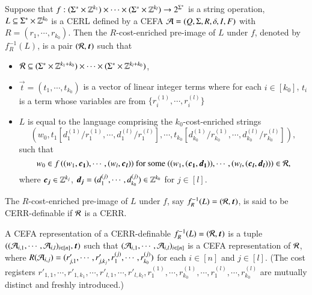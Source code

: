 \begin{definition}
Suppose that $f: (\Sigma^* \times \mathbb{Z}^{k_1}) \times \cdots \times (\Sigma^* \times \mathbb{Z}^{k_l}) \rightarrow 2^{\Sigma^*}$ is a string operation, $L \subseteq \Sigma^* \times \mathbb{Z}^{k_0}$ is a CERL defined by a CEFA $\mathcal{A}=(Q, \Sigma, R, \delta, I, F)$ with $R= (r_1, \cdots, r_{k_0})$. Then the $R$-cost-enriched pre-image of $L$ under $f$, denoted by $f^{-1}_R(L)$, is a pair $(\cR, \vec{t})$ such that 
\begin{itemize}
\item $\mathcal{R} \subseteq (\Sigma^* \times \mathbb{Z}^{k_1 + k_0}) \times \cdots \times (\Sigma^* \times \mathbb{Z}^{k_l + k_0})$,
\item $\vec{t} = (t_1, \cdots ,t_{k_0})$ is a vector of linear integer terms where for each $i \in [k_0]$, $t_i$ is a term whose variables are from $\{r^{(1)}_i, \cdots, r^{(l)}_i\}$ 

\item $L$ is equal to the language comprising the $k_0$-cost-enriched strings
%
\[\left(w_0, t_1\left[d^{(1)}_{1}/r^{(1)}_1, \cdots, d^{(l)}_{1}/r^{(l)}_1\right], \cdots, t_{k_0}\left[d^{(1)}_{k_0}/r^{(1)}_{k_0}, \cdots, d^{(l)}_{k_0}/r^{(l)}_{k_0}\right]
\right), \]
%
such that 
\[w_0 \in f\left((w_1, \vec{c_1}), \cdots, (w_l, \vec{c_l}\right)) \mbox{ for some } ((w_1, (\vec{c_1}, \vec{d_1})), \cdots, (w_l, (\vec{c_l}, \vec{d_l}))) \in \cR,\]
where $\vec{c_j} \in \Int^{k_j}$, $\vec{d_j} = (d^{(j)}_{1}, \cdots, d^{(j)}_{k_0}) \in \Int^{k_0}$ for $j\in [l]$.


%
\end{itemize}
The $R$-cost-enriched pre-image of $L$ under $f$, say $f^{-1}_R(L)=(\cR, \vec{t})$, is said to be CERR-definable if $\mathcal{R}$ is a CERR. 

A CEFA representation of a CERR-definable $f^{-1}_R(L)=(\cR, \vec{t})$ is a tuple $((\CEFA_{i,1}, \cdots, \CEFA_{i, l})_{i \in [n]}, \vec{t})$ such that $(\mathcal{A}_{i,1}, \cdots, \mathcal{A}_{i, l})_{i \in [n]}$ is a CEFA representation of $\mathcal{R}$, where $R(\mathcal{A}_{i,j})=(r'_{j,1}, \cdots, r'_{j,k_j}, r^{(j)}_1, \cdots,r^{(j)}_{k_0})$ for each $i \in [n]$ and $j \in [l]$. (The cost registers $r'_{1,1}, \cdots, r'_{1,k_1},\cdots, r'_{l,1}, \cdots, r'_{l,k_l}, r^{(1)}_1, \cdots,r^{(1)}_{k_0}, \cdots, r^{(l)}_1, \cdots,r^{(l)}_{k_0}$ are mutually distinct and freshly introduced.) 
\end{definition}


